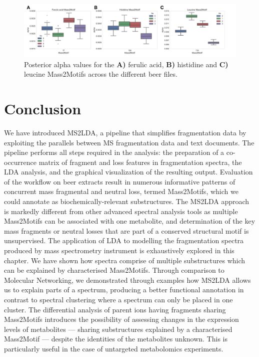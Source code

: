 \begin{figure}[!htbp]
\centering\includegraphics[width=1.0\linewidth]{07-lda/figures/multifile_alpha.pdf}
\centering\caption{Posterior alpha values for the \textbf{A)} ferulic acid, \textbf{B)} histidine and \textbf{C)} leucine Mass2Motifs across the different beer files. \label{fig:multifile-lda-alpha}}
\end{figure}

\section{Conclusion}

We have introduced MS2LDA, a pipeline that simplifies fragmentation data by exploiting the parallels between MS fragmentation data and text documents. The pipeline performs all steps required in the analysis: the preparation of a co-occurrence matrix of fragment and loss features in fragmentation spectra, the LDA analysis, and the graphical visualization of the resulting output. Evaluation of the workflow on beer extracts result in numerous informative patterns of concurrent mass fragmental and neutral loss, termed Mass2Motifs, which we could annotate as biochemically-relevant substructures. The MS2LDA approach is markedly different from other advanced spectral analysis tools as multiple Mass2Motifs can be associated with one metabolite, and determination of the key mass fragments or neutral losses that are part of a conserved structural motif is unsupervised. The application of LDA to modelling the fragmentation spectra produced by mass spectrometry instrument is exhaustively explored in this chapter. We have shown how spectra comprise of multiple substructures which can be explained by characterised Mass2Motifs. Through comparison to Molecular Networking, we demonstrated through examples how MS2LDA allows us to explain parts of a spectrum, producing a better functional annotation in contrast to spectral clustering where a spectrum can only be placed in one cluster. The differential analysis of parent ions having fragments sharing Mass2Motifs introduces the possibility of assessing changes in the expression levels of metabolites --- sharing substructures explained by a characterised Mass2Motif --- despite the identities of the metabolites unknown. This is particularly useful in the case of untargeted metabolomics experiments.

